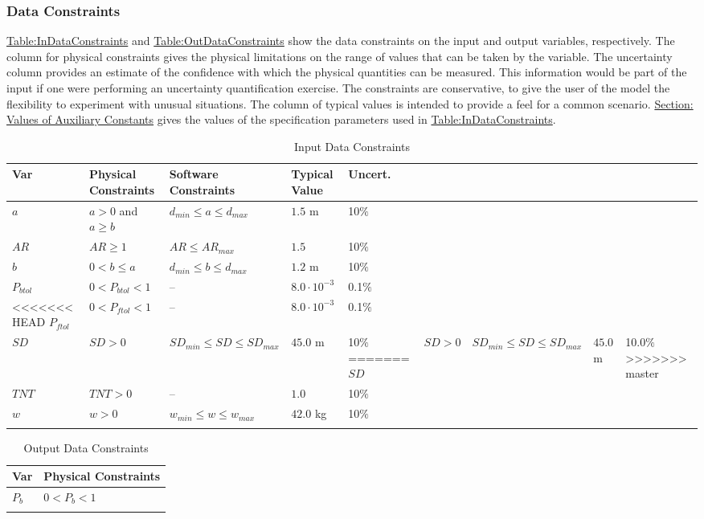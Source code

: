 \documentclass[12pt]{article}
\begin{document}
\subsubsection{Data Constraints}
\label{Sec:DataConstraints}
\hyperref[Table:InDataConstraints]{Table:InDataConstraints} and \hyperref[Table:OutDataConstraints]{Table:OutDataConstraints} show the data constraints on the input and output variables, respectively. The column for physical constraints gives the physical limitations on the range of values that can be taken by the variable. The uncertainty column provides an estimate of the confidence with which the physical quantities can be measured. This information would be part of the input if one were performing an uncertainty quantification exercise. The constraints are conservative, to give the user of the model the flexibility to experiment with unusual situations. The column of typical values is intended to provide a feel for a common scenario. \hyperref[Sec:AuxConstants]{Section: Values of Auxiliary Constants} gives the values of the specification parameters used in \hyperref[Table:InDataConstraints]{Table:InDataConstraints}.
\begin{longtable}{l l l l l}
\toprule
Var & Physical Constraints & Software Constraints & Typical Value & Uncert.
\\
\midrule
\endhead
$a$ & $a>0$ and $a\geq{}b$ & ${d_{min}}\leq{}a\leq{}{d_{max}}$ & $1.5$ m & 10$\%$
\\
$AR$ & $AR\geq{}1$ & $AR\leq{}{AR_{max}}$ & $1.5$ & 10$\%$
\\
$b$ & $0<b\leq{}a$ & ${d_{min}}\leq{}b\leq{}{d_{max}}$ & $1.2$ m & 10$\%$
\\
${P_{btol}}$ & $0<{P_{btol}}<1$ & -- & $8.0\cdot{}10^{-3}$ & 0.1$\%$
\\
<<<<<<< HEAD
${P_{ftol}}$ & $0<{P_{ftol}}<1$ & -- & $8.0\cdot{}10^{-3}$ & 0.1$\%$
\\
$SD$ & $SD>0$ & ${SD_{min}}\leq{}SD\leq{}{SD_{max}}$ & $45.0$ m & 10$\%$
=======
$SD$ & $SD>0$ & ${SD_{min}}\leq{}SD\leq{}{SD_{max}}$ & $45.0$ m & 10.0$\%$
>>>>>>> master
\\
$TNT$ & $TNT>0$ & -- & $1.0$ & 10$\%$
\\
$w$ & $w>0$ & ${w_{min}}\leq{}w\leq{}{w_{max}}$ & $42.0$ kg & 10$\%$
\\
\bottomrule
\caption{Input Data Constraints}
\label{Table:InDataConstraints}
\end{longtable}
\begin{longtable}{l l}
\toprule
Var & Physical Constraints
\\
\midrule
\endhead
${P_{b}}$ & $0<{P_{b}}<1$
\\
\bottomrule
\caption{Output Data Constraints}
\label{Table:OutDataConstraints}
\end{longtable}
\end{document}
